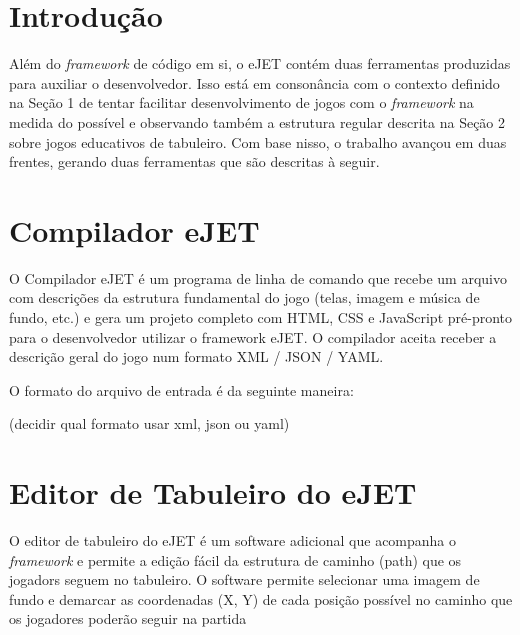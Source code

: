 \section{Introdução}

Além do \textit{framework} de código em si, o eJET contém duas ferramentas produzidas para auxiliar o desenvolvedor. Isso está em consonância com o contexto definido na Seção 1 de tentar facilitar desenvolvimento de jogos com o \textit{framework} na medida do possível e observando também a estrutura regular descrita na Seção 2 sobre jogos educativos de tabuleiro. Com base nisso, o trabalho avançou em duas frentes, gerando duas ferramentas que são descritas à seguir.

\section{Compilador eJET}

O Compilador eJET é um programa de linha de comando que recebe um arquivo com descrições da estrutura fundamental do jogo (telas, imagem e música de fundo, etc.) e gera um projeto completo com HTML, CSS e JavaScript pré-pronto para o desenvolvedor utilizar o framework eJET. O compilador aceita receber a descrição geral do jogo num formato XML / JSON / YAML.

O formato do arquivo de entrada é da seguinte maneira:

(decidir qual formato usar xml, json ou yaml)

\section{Editor de Tabuleiro do eJET}

O editor de tabuleiro do eJET é um software adicional que acompanha o \textit{framework} e permite a edição fácil da estrutura de caminho (path) que os jogadors seguem no tabuleiro. O software permite selecionar uma imagem de fundo e demarcar as coordenadas (X, Y) de cada posição possível no caminho que os jogadores poderão seguir na partida



